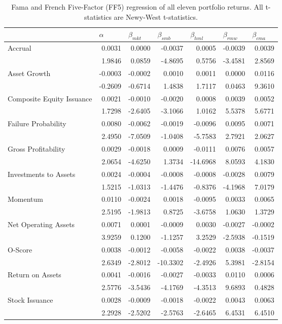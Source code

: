 \begin{table}[h]
\scriptsize
\caption{\newline Fama and French Five-Factor (FF5) regression of all eleven portfolio returns. All t-statistics are Newy-West t-statistics.}
\label{tab:Table 4}
\begin{tabular}{@{}lrrrrrr@{}}
\toprule
& \multicolumn{1}{l}{$\alpha$} & \multicolumn{1}{l}{$\beta_{mkt}$} & \multicolumn{1}{l}{$\beta_{smb}$} & \multicolumn{1}{l}{$\beta_{hml}$} & \multicolumn{1}{l}{$\beta_{rmw}$} & \multicolumn{1}{l}{$\beta_{cma}$} \\ \midrule
\multirow{2}{*}{Accrual} & 0.0031 & 0.0000 & -0.0037 & 0.0005 & -0.0039 & 0.0039 \\
& 1.9846 & 0.0859 & -4.8695 & 0.5756 & -3.4581 & 2.8569 \\
\multirow{2}{*}{Asset Growth} & -0.0003 & -0.0002 & 0.0010 & 0.0011 & 0.0000 & 0.0116 \\
& -0.2609 & -0.6714 & 1.4838 & 1.7117 & 0.0463 & 9.3610 \\
\multirow{2}{*}{Composite Equity Issuance} & 0.0021 & -0.0010 & -0.0020 & 0.0008 & 0.0039 & 0.0052 \\
& 1.7298 & -2.6405 & -3.1066 & 1.0162 & 5.5378 & 5.6771 \\
\multirow{2}{*}{Failure Probability} & 0.0080 & -0.0062 & -0.0019 & -0.0096 & 0.0095 & 0.0071 \\
& 2.4950 & -7.0509 & -1.0408 & -5.7583 & 2.7921 & 2.0627 \\
\multirow{2}{*}{Gross Profitability} & 0.0029 & -0.0018 & 0.0009 & -0.0111 & 0.0076 & 0.0057 \\
& 2.0654 & -4.6250 & 1.3734 & -14.6968 & 8.0593 & 4.1830 \\
\multirow{2}{*}{Investments to Assets} & 0.0024 & -0.0004 & -0.0008 & -0.0008 & -0.0028 & 0.0079 \\
& 1.5215 & -1.0313 & -1.4476 & -0.8376 & -4.1968 & 7.0179 \\
\multirow{2}{*}{Momentum} & 0.0110 & -0.0024 & 0.0018 & -0.0095 & 0.0033 & 0.0065 \\
& 2.5195 & -1.9813 & 0.8725 & -3.6758 & 1.0630 & 1.3729 \\
\multirow{2}{*}{Net Operating Assets} & 0.0071 & 0.0001 & -0.0009 & 0.0030 & -0.0027 & -0.0002 \\
& 3.9259 & 0.1200 & -1.1257 & 3.2529 & -2.5938 & -0.1519 \\
\multirow{2}{*}{O-Score} & 0.0038 & -0.0012 & -0.0058 & -0.0022 & 0.0038 & -0.0037 \\
& 2.6349 & -2.8012 & -10.3302 & -2.4926 & 5.3981 & -2.8154 \\
\multirow{2}{*}{Return on Assets} & 0.0041 & -0.0016 & -0.0027 & -0.0033 & 0.0110 & 0.0006 \\
& 2.5776 & -3.5436 & -4.1769 & -4.3513 & 9.6893 & 0.4828 \\
\multirow{2}{*}{Stock Issuance} & 0.0028 & -0.0009 & -0.0018 & -0.0022 & 0.0043 & 0.0063 \\
& 2.2928 & -2.5202 & -2.5763 & -2.6465 & 6.4531 & 6.4510 \\ \bottomrule
\end{tabular}%
\end{table}

